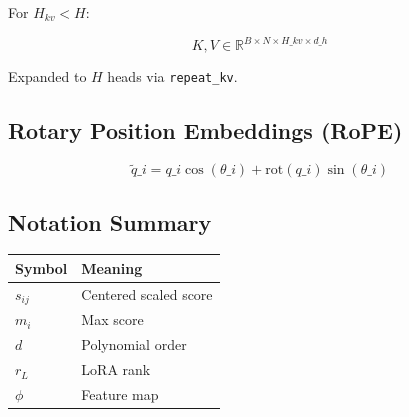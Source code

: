 For $H_{kv} < H$:

\[
K, V \in \mathbb{R}^{B \times N \times H\_{kv} \times d\_h}
\tag{3.11}
\]

Expanded to $H$ heads via \texttt{repeat\_kv}.

\subsection{Rotary Position Embeddings (RoPE)}

\[
\tilde{q}\_i = q\_i \cos(\theta\_i) + \text{rot}(q\_i) \sin(\theta\_i)
\tag{3.12}
\]

\subsection{Notation Summary}

\begin{table}[H]
\centering
\small
\begin{tabular}{ll}
\toprule
\textbf{Symbol} & \textbf{Meaning} \\
\midrule
$s_{ij}$ & Centered scaled score \\
$m_i$ & Max score \\
$d$ & Polynomial order \\
$r_L$ & LoRA rank \\
$\phi$ & Feature map \\
\bottomrule
\end{tabular}
\end{table}

